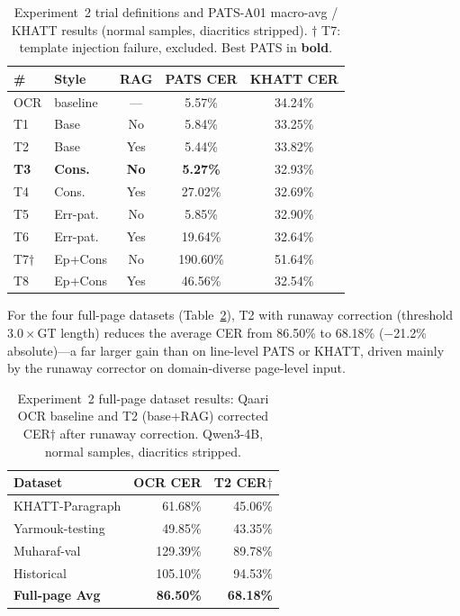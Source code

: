 \documentclass[conference]{IEEEtran}
\begin{document}
\begin{table}[t]
\caption{Experiment~2 trial definitions and PATS-A01 macro-avg / KHATT results
(normal samples, diacritics stripped). $\dagger$ T7: template injection failure,
excluded. Best PATS in \textbf{bold}.}
\label{tab:exp2_pats}
\begin{center}
\small
\begin{tabular}{llccc}
\toprule
\textbf{\#} & \textbf{Style} & \textbf{RAG} & \textbf{PATS CER} & \textbf{KHATT CER} \\
\midrule
OCR & baseline  & --- & 5.57\% & 34.24\% \\
T1 & Base      & No  & 5.84\% & 33.25\% \\
T2 & Base      & Yes & 5.44\% & 33.82\% \\
\textbf{T3} & \textbf{Cons.} & \textbf{No} & \textbf{5.27\%} & 32.93\% \\
T4 & Cons.     & Yes & 27.02\% & 32.69\% \\
T5 & Err-pat.  & No  & 5.85\% & 32.90\% \\
T6 & Err-pat.  & Yes & 19.64\% & 32.64\% \\
T7$\dagger$ & Ep+Cons & No & 190.60\% & 51.64\% \\
T8 & Ep+Cons   & Yes & 46.56\% & 32.54\% \\
\bottomrule
\end{tabular}
\end{center}
\end{table}

For the four full-page datasets (Table~\ref{tab:exp2_fullpage}), T2 with runaway
correction (threshold $3.0\times$GT length) reduces the average CER from 86.50\%
to 68.18\% ($-$21.2\% absolute)---a far larger gain than on line-level PATS or
KHATT, driven mainly by the runaway corrector on domain-diverse page-level input.

\begin{table}[t]
\caption{Experiment~2 full-page dataset results: Qaari OCR baseline and
T2 (base+RAG) corrected CER$\dagger$ after runaway correction.
Qwen3-4B, normal samples, diacritics stripped.}
\label{tab:exp2_fullpage}
\begin{center}
\small
\begin{tabular}{lrr}
\toprule
\textbf{Dataset} & \textbf{OCR CER} & \textbf{T2 CER$\dagger$} \\
\midrule
KHATT-Paragraph  & 61.68\% & 45.06\% \\
Yarmouk-testing  & 49.85\% & 43.35\% \\
Muharaf-val      & 129.39\% & 89.78\% \\
Historical       & 105.10\% & 94.53\% \\
\midrule
\textbf{Full-page Avg} & \textbf{86.50\%} & \textbf{68.18\%} \\
\bottomrule
\end{tabular}
\end{center}
\end{table}
\end{document}

